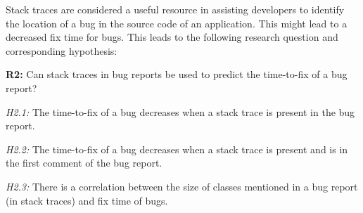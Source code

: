 \vspace{\baselineskip}
\hypad{}

\vspace{\baselineskip}
\hypae{}

\vspace{\baselineskip}
\hypaf{}

\vspace{\baselineskip}

Stack traces are considered a useful resource in assisting developers to identify the location of a bug in the source code of an application. This might lead to a decreased fix time for bugs. This leads to the following research question and corresponding hypothesis:

\newcommand{\questionb}{\begin{minipage}[t]{4.5 in}\textbf{R2:} Can stack traces in bug reports be used to predict the time-to-fix of a bug report? \end{minipage}} 

\newcommand{\hypba}{\begin{minipage}[t]{4.5 in}\emph{H2.1:} The time-to-fix of a bug decreases when a stack trace is present in the bug report. \end{minipage}} 

\newcommand{\hypbb}{\begin{minipage}[t]{4.5 in}\emph{H2.2:} The time-to-fix of a bug decreases when a stack trace is present and is in the first comment of the bug report.\end{minipage}} 

\newcommand{\hypbc}{\begin{minipage}[t]{4.5 in}\emph{H2.3:} There is a correlation between the size of classes mentioned in a bug report (in stack traces) and fix time of bugs. \end{minipage}}

\vspace{\baselineskip}
\questionb{}

\vspace{\baselineskip}
\hypba{}

\vspace{\baselineskip}
\hypbb{}

\vspace{\baselineskip}
\hypbc{}
\vspace{\baselineskip}

